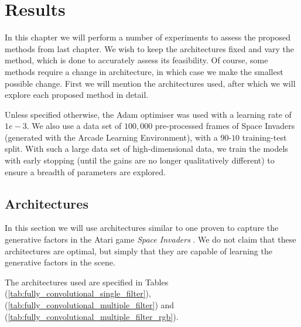\chapter{Results}

\label{ch:Results}

In this chapter we will perform a number of experiments to assess the proposed methods from last chapter. We wish to keep the architectures fixed and vary the method, which is done to accurately assess its feasibility. Of course, some methods require a change in architecture, in which case we make the smallest possible change. First we will mention the architectures used, after which we will explore each proposed method in detail.

Unless specified otherwise, the Adam optimiser was used with a learning rate of $1e-3$. We also use a data set of $100,000$ pre-processed frames of Space Invaders (generated with the Arcade Learning Environment), with a $90$-$10$ training-test split. With such a large data set of high-dimensional data, we train the models with early stopping (until the gains are no longer qualitatively different) to ensure a breadth of parameters are explored.

%
%
%
%
%
\section{Architectures}

In this section we will use architectures similar to one proven to capture the generative factors in the Atari game \textit{Space Invaders} \cite{Higgins2016}. We do not claim that these architectures are optimal, but simply that they are capable of learning the generative factors in the scene.

The architectures used are specified in Tables (\ref{tab:fully_convolutional_single_filter}), (\ref{tab:fully_convolutional_multiple_filter}) and (\ref{tab:fully_convolutional_multiple_filter_rgb}).


